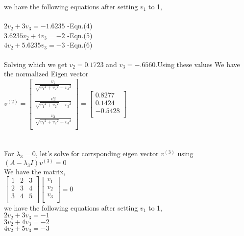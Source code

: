 \documentclass{article}
\begin{document}
we have the following equations after setting $v_1$ to 1,\\
\\
$2v_2 + 3v_3 = -1.6235$ -Eqn.(4)\\
$3.6235v_2 + 4v_3 = -2$ -Eqn.(5)\\
$4v_2 + 5.6235v_3 = -3$ -Eqn.(6)\\
\\
Solving which we get $v_2 = 0.1723$ and $v_3 = -.6560$.Using these values
We have the normalized Eigen vector\\ $v^{(2)} =  \begin{bmatrix}
\frac{v_1}{\sqrt{{v_1}^2 + {v_2}^2} + {v_3}^2} \\
\\
   \frac{v2}{\sqrt{{v_1}^2 + {v_2}^2} + {v_3}^2}\\
\\
    \frac{v_3}{\sqrt{{v_1}^2 + {v_2}^2} + {v_3}^2} \\
\end{bmatrix} = \begin{bmatrix}
0.8277 \\
  0.1424\\
    -0.5428 \\
\end{bmatrix}$\\
\\
\\
For ${\lambda}_3 = 0$, let's solve for corrsponding eigen vector $v^{(3)}$ using $(A - {{\lambda}_3}I)v^{(3)} = 0$\\We have the matrix,\\
$\begin{bmatrix}
1   &     2&       3\\
   2  &  3    &    4\\
    3  &  4 &   5 \\
\end{bmatrix}\begin{bmatrix}
v_1 \\
   v_2\\
    v_3 \\
\end{bmatrix} = 0$\\
we have the following equations after setting $v_1$ to 1,\\
$2v_2 + 3v_3 = -1$\\
$3v_2 + 4v_3 = -2$\\
$4v_2 + 5v_3 = -3$\\
\\
\end{document}
